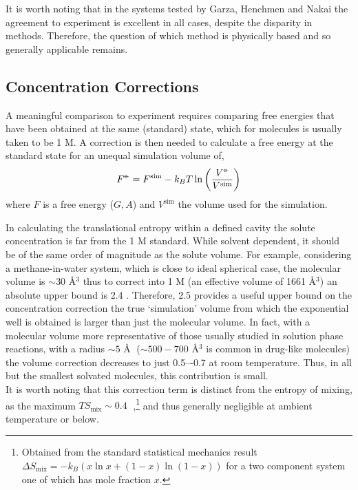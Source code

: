\documentclass[../main.tex]{subfiles}
\begin{document}
It is worth noting that in the systems tested by Garza, Henchmen and Nakai the agreement to experiment is excellent in all cases, despite the disparity in methods. Therefore, the question of which method is physically based and so generally applicable remains.

\subsection{Concentration Corrections}

A meaningful comparison to experiment requires comparing free energies that have been obtained at the same (standard) state, which for molecules is usually taken to be 1 M. A correction is then needed to calculate a free energy at the standard state for an unequal simulation volume of,\cite{General2010} 
\begin{equation}
	F^{{\circ\kern-0.495em-}} = F^\text{sim} - k_BT \ln\left(\frac{V^{\circ\kern-0.495em-}}{V^\text{sim}}\right)
\end{equation}
where $F$ is a free energy ($G, A$) and $V^\text{sim}$ the volume used for the simulation. 

In calculating the translational entropy within a defined cavity the solute concentration is far from the 1 M standard. While solvent dependent, it should be of the same order of magnitude as the solute volume. For example, considering a methane-in-water system, which is close to ideal spherical case, the molecular volume is $\sim 30$ \AA$^3$\cite{Zhao2003} thus to correct into 1 M (an effective volume of 1661 \AA$^3$) an absolute upper bound is 2.4 \kcal. 
Therefore, 2.5 \kcalx provides a useful upper bound on the concentration correction the true `simulation' volume from which the exponential well is obtained is larger than just the molecular volume. In fact, with a molecular volume more representative of those usually studied in solution phase reactions, with a radius $\sim 5$ \AA$\;$  ($\sim 500-700$ \AA$^3$ is common in drug-like molecules\cite{Khanna2009}) the volume correction decreases to just 0.5–-0.7 \kcalx at room temperature. Thus, in all but the smallest solvated molecules, this contribution is small.
\\
It is worth noting that this correction term is distinct from the entropy of mixing, as the maximum $TS_\text{mix} \sim 0.4\;$ \kcal,\footnote{Obtained from the standard statistical mechanics result $\Delta S_\text{mix} = -k_B(x \ln x + (1-x)\ln(1 - x))$ for a two component system one of which has mole fraction $x$.}  and thus generally negligible at ambient temperature or below.
\end{document}
